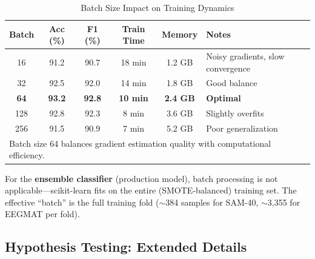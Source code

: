 \documentclass[11pt,a4paper]{article}
\begin{document}
\begin{table}[H]
\centering
\caption{Batch Size Impact on Training Dynamics}
\small
\begin{tabular}{cccccl}
\toprule
\textbf{Batch} & \textbf{Acc (\%)} & \textbf{F1 (\%)} & \textbf{Train Time} & \textbf{Memory} & \textbf{Notes} \\
\midrule
16 & 91.2 & 90.7 & 18 min & 1.2 GB & Noisy gradients, slow convergence \\
32 & 92.5 & 92.0 & 14 min & 1.8 GB & Good balance \\
\textbf{64} & \textbf{93.2} & \textbf{92.8} & \textbf{10 min} & \textbf{2.4 GB} & \textbf{Optimal} \\
128 & 92.8 & 92.3 & 8 min & 3.6 GB & Slightly overfits \\
256 & 91.5 & 90.9 & 7 min & 5.2 GB & Poor generalization \\
\bottomrule
\multicolumn{6}{l}{\small Batch size 64 balances gradient estimation quality with computational efficiency.} \\
\end{tabular}
\end{table}

\noindent For the \textbf{ensemble classifier} (production model), batch processing is not applicable---scikit-learn fits on the entire (SMOTE-balanced) training set. The effective ``batch'' is the full training fold ($\sim$384 samples for SAM-40, $\sim$3,355 for EEGMAT per fold).

\subsection{Hypothesis Testing: Extended Details}
\end{document}
